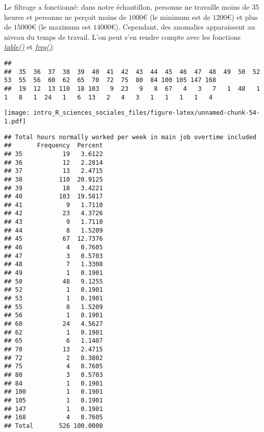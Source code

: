 \documentclass[
]{book}
\newenvironment{Shaded}{\begin{snugshade}}{\end{snugshade}}
\newcommand{\FunctionTok}[1]{\textcolor[rgb]{0.00,0.00,0.00}{#1}}
\newcommand{\NormalTok}[1]{#1}
\newcommand{\SpecialCharTok}[1]{\textcolor[rgb]{0.00,0.00,0.00}{#1}}
\begin{document}
Le filtrage a fonctionné: dans notre échantillon, personne ne travaille moins de 35 heures et personne ne perçoit moins de \(1000€\) (le minimum est de \(1200€\)) et plus de \(15000€\) (le maximum est \(14000€\)). Cependant, des anomalies apparaissent au niveau du temps de travail. L'on peut s'en rendre compte avec les fonctions \href{https://www.rdocumentation.org/packages/base/versions/3.6.2/topics/table}{\emph{table()}} et \href{https://www.rdocumentation.org/packages/descr/versions/1.1.5/topics/freq}{\emph{freq()}}:

\begin{Shaded}
\end{Shaded}

\begin{verbatim}
## 
##  35  36  37  38  39  40  41  42  43  44  45  46  47  48  49  50  52  53  55  56  60  62  65  70  72  75  80  84 100 105 147 168 
##  19  12  13 110  18 103   9  23   9   8  67   4   3   7   1  48   1   1   8   1  24   1   6  13   2   4   3   1   1   1   1   4
\end{verbatim}

\begin{Shaded}
\end{Shaded}

\texttt{[image: intro\_R\_sciences\_sociales\_files/figure-latex/unnamed-chunk-54-1.pdf]}

\begin{verbatim}
## Total hours normally worked per week in main job overtime included 
##       Frequency  Percent
## 35           19   3.6122
## 36           12   2.2814
## 37           13   2.4715
## 38          110  20.9125
## 39           18   3.4221
## 40          103  19.5817
## 41            9   1.7110
## 42           23   4.3726
## 43            9   1.7110
## 44            8   1.5209
## 45           67  12.7376
## 46            4   0.7605
## 47            3   0.5703
## 48            7   1.3308
## 49            1   0.1901
## 50           48   9.1255
## 52            1   0.1901
## 53            1   0.1901
## 55            8   1.5209
## 56            1   0.1901
## 60           24   4.5627
## 62            1   0.1901
## 65            6   1.1407
## 70           13   2.4715
## 72            2   0.3802
## 75            4   0.7605
## 80            3   0.5703
## 84            1   0.1901
## 100           1   0.1901
## 105           1   0.1901
## 147           1   0.1901
## 168           4   0.7605
## Total       526 100.0000
\end{verbatim}
\end{document}
